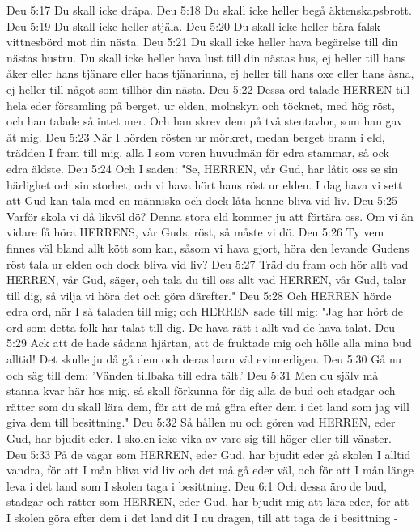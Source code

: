 Deu 5:17  Du skall icke dräpa.
Deu 5:18  Du skall icke heller begå äktenskapsbrott.
Deu 5:19  Du skall icke heller stjäla.
Deu 5:20  Du skall icke heller bära falsk vittnesbörd mot din nästa.
Deu 5:21  Du skall icke heller hava begärelse till din nästas hustru. Du skall icke heller hava lust till din nästas hus, ej heller till hans åker eller hans tjänare eller hans tjänarinna, ej heller till hans oxe eller hans åsna, ej heller till något som tillhör din nästa.
Deu 5:22  Dessa ord talade HERREN till hela eder församling på berget, ur elden, molnskyn och töcknet, med hög röst, och han talade så intet mer. Och han skrev dem på två stentavlor, som han gav åt mig.
Deu 5:23  När I hörden rösten ur mörkret, medan berget brann i eld, trädden I fram till mig, alla I som voren huvudmän för edra stammar, så ock edra äldste.
Deu 5:24  Och I saden: "Se, HERREN, vår Gud, har låtit oss se sin härlighet och sin storhet, och vi hava hört hans röst ur elden. I dag hava vi sett att Gud kan tala med en människa och dock låta henne bliva vid liv.
Deu 5:25  Varför skola vi då likväl dö? Denna stora eld kommer ju att förtära oss. Om vi än vidare få höra HERRENS, vår Guds, röst, så måste vi dö.
Deu 5:26  Ty vem finnes väl bland allt kött som kan, såsom vi hava gjort, höra den levande Gudens röst tala ur elden och dock bliva vid liv?
Deu 5:27  Träd du fram och hör allt vad HERREN, vår Gud, säger, och tala du till oss allt vad HERREN, vår Gud, talar till dig, så vilja vi höra det och göra därefter."
Deu 5:28  Och HERREN hörde edra ord, när I så taladen till mig; och HERREN sade till mig: "Jag har hört de ord som detta folk har talat till dig. De hava rätt i allt vad de hava talat.
Deu 5:29  Ack att de hade sådana hjärtan, att de fruktade mig och hölle alla mina bud alltid! Det skulle ju då gå dem och deras barn väl evinnerligen.
Deu 5:30  Gå nu och säg till dem: 'Vänden tillbaka till edra tält.'
Deu 5:31  Men du själv må stanna kvar här hos mig, så skall förkunna för dig alla de bud och stadgar och rätter som du skall lära dem, för att de må göra efter dem i det land som jag vill giva dem till besittning."
Deu 5:32  Så hållen nu och gören vad HERREN, eder Gud, har bjudit eder. I skolen icke vika av vare sig till höger eller till vänster.
Deu 5:33  På de vägar som HERREN, eder Gud, har bjudit eder gå skolen I alltid vandra, för att I mån bliva vid liv och det må gå eder väl, och för att I mån länge leva i det land som I skolen taga i besittning.
Deu 6:1  Och dessa äro de bud, stadgar och rätter som HERREN, eder Gud, har bjudit mig att lära eder, för att I skolen göra efter dem i det land dit I nu dragen, till att taga de i besittning -
